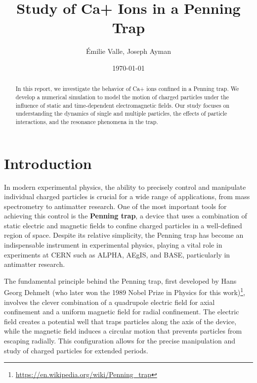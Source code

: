 \documentclass[english,notitlepage,reprint,nofootinbib]{revtex4-2}  %
\begin{document}
\title{Study of Ca+ Ions in a Penning Trap}  %
\author{Émilie Valle, Joseph Ayman}       %
\date{\today}                             %
\noaffiliation                            %

\begin{abstract}
     In this report, we investigate the behavior of Ca+ ions confined in a Penning trap. We develop a numerical simulation to model the motion of charged particles under the influence of static and time-dependent electromagnetic fields. Our study focuses on understanding the dynamics of single and multiple particles, the effects of particle interactions, and the resonance phenomena in the trap.
    
\end{abstract}
\maketitle


\section{Introduction}\label{sec:introduction}
In modern experimental physics, the ability to precisely control and manipulate individual charged particles is crucial for a wide range of applications, from mass spectrometry to antimatter research. One of the most important tools for achieving this control is the \textbf{Penning trap}, a device that uses a combination of static electric and magnetic fields to confine charged particles in a well-defined region of space. Despite its relative simplicity, the Penning trap has become an indispensable instrument in experimental physics, playing a vital role in experiments at CERN such as ALPHA, AEgIS, and BASE, particularly in antimatter research.

The fundamental principle behind the Penning trap, first developed by Hans Georg Dehmelt (who later won the 1989 Nobel Prize in Physics for this work)\footnote{\url{https://en.wikipedia.org/wiki/Penning_trap}}, involves the clever combination of a quadrupole electric field for axial confinement and a uniform magnetic field for radial confinement. The electric field creates a potential well that traps particles along the axis of the device, while the magnetic field induces a circular motion that prevents particles from escaping radially. This configuration allows for the precise manipulation and study of charged particles for extended periods.
\end{document}
